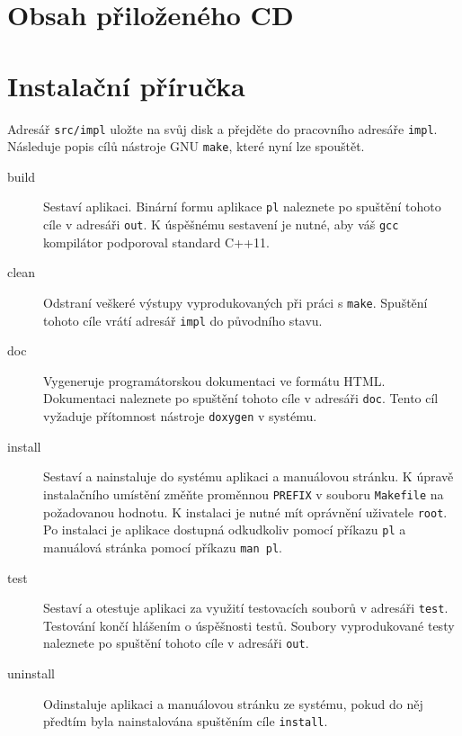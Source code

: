\documentclass[thesis=B,czech,hidelinks]{thesis}[2012/06/26]
\begin{document}
%
%
%

\chapter{Obsah přiloženého CD}

\begin{figure}
\end{figure}

\chapter{Instalační příručka}

Adresář \texttt{src/impl} uložte na svůj disk a přejděte do pracovního adresáře \texttt{impl}. Následuje popis cílů nástroje GNU \texttt{make}, které nyní lze spouštět.

\begin{description}
	\item[build] Sestaví aplikaci. Binární formu aplikace \texttt{pl} naleznete po spuštění tohoto cíle v adresáři \texttt{out}. K úspěšnému sestavení je nutné, aby váš \texttt{gcc} kompilátor podporoval standard C++11.
	\item[clean] Odstraní veškeré výstupy vyprodukovaných při práci s \texttt{make}. Spuštění tohoto cíle vrátí adresář \texttt{impl} do původního stavu.
	\item[doc] Vygeneruje programátorskou dokumentaci ve formátu HTML. Dokumentaci naleznete po spuštění tohoto cíle v adresáři \texttt{doc}. Tento cíl vyžaduje přítomnost nástroje \texttt{doxygen} v systému.
	\item[install] Sestaví a nainstaluje do systému aplikaci a manuálovou stránku. K úpravě instalačního umístění změňte proměnnou \texttt{PREFIX} v souboru \texttt{Makefile} na požadovanou hodnotu. K instalaci je nutné mít oprávnění uživatele \texttt{root}. Po instalaci je aplikace dostupná odkudkoliv pomocí příkazu \texttt{pl} a manuálová stránka pomocí příkazu \texttt{man pl}.
	\item[test] Sestaví a otestuje aplikaci za využití testovacích souborů v adresáři \texttt{test}. Testování končí hlášením o úspěšnosti testů. Soubory vyprodukované testy naleznete po spuštění tohoto cíle v adresáři \texttt{out}.
	\item[uninstall] Odinstaluje aplikaci a manuálovou stránku ze systému, pokud do něj předtím byla nainstalována spuštěním cíle \texttt{install}. 
\end{description}
\end{document}
